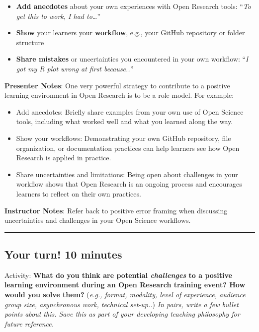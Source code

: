 \documentclass[
  letterpaper,
  DIV=11,
  numbers=noendperiod]{scrartcl}
\providecommand{\tightlist}{%
  \setlength{\itemsep}{0pt}\setlength{\parskip}{0pt}}
\begin{document}
\begin{itemize}
\tightlist
\item
  \textbf{Add anecdotes} about your own experiences with Open Research
  tools: ``\emph{To get this to work, I had to\ldots{}}''
\item
  \textbf{Show} your learners your \textbf{workflow}, e.g., your GitHub
  repository or folder structure
\item
  \textbf{Share mistakes} or uncertainties you encountered in your own
  workflow: ``\emph{I got my R plot wrong at first because..}''
\end{itemize}

\textbf{Presenter Notes}: One very powerful strategy to contribute to a
positive learning environment in Open Research is to be a role model.
For example:

\begin{itemize}
\tightlist
\item
  Add anecdotes: Briefly share examples from your own use of Open
  Science tools, including what worked well and what you learned along
  the way.
\item
  Show your workflows: Demonstrating your own GitHub repository, file
  organization, or documentation practices can help learners see how
  Open Research is applied in practice.
\item
  Share uncertainties and limitations: Being open about challenges in
  your workflow shows that Open Research is an ongoing process and
  encourages learners to reflect on their own practices.
\end{itemize}

\textbf{Instructor Notes}: Refer back to positive error framing when
discussing uncertainties and challenges in your Open Science workflows.

\begin{center}\rule{0.5\linewidth}{0.5pt}\end{center}

\subsection{Your turn! 10 minutes}\label{your-turn-10-minutes}

Activity: \textbf{What do you think are potential \emph{challenges} to a
positive learning environment during an Open Research training event?
How would you solve them?} (\emph{e.g., format, modality, level of
experience, audience group size, asynchronous work, technical set-up..})
\emph{In pairs, write a few bullet points about this. Save this as part
of your developing teaching philosophy for future reference.}
\end{document}

